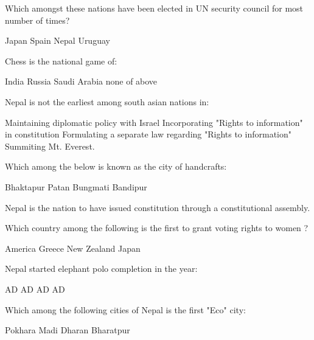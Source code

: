 \begin{questions}
\question Which amongst these nations have been elected in UN security council for most number of times?
  \begin{choices}
  \choice Japan
  \choice Spain
  \choice Nepal
  \CorrectChoice Uruguay
  \end{choices}

\question Chess is the national game of:

  \begin{oneparchoices}
  \choice India
  \CorrectChoice Russia
  \choice Saudi Arabia
  \choice none of above
  \end{oneparchoices}

\question Nepal is not the earliest among south asian nations in:
  \begin{choices}
  \choice Maintaining diplomatic policy with Israel
  \CorrectChoice Incorporating "Rights to information" in constitution
  \choice Formulating a separate law regarding "Rights to information"
  \choice Summiting Mt. Everest.
  \end{choices}

\question Which among the below is known as the city of handcrafts:
  \begin{choices}
  \choice Bhaktapur
  \CorrectChoice Patan
  \choice Bungmati
  \choice Bandipur
  \end{choices}

\question Nepal is the \fillin[][2cm] nation to have issued constitution through a constitutional assembly.
  \begin{choices}
  \end{choices}

\question Which country among the following is the first to grant voting rights to women ?
  \begin{choices}
  \choice America
  \choice Greece
  \CorrectChoice New Zealand
  \choice Japan
  \end{choices}

\question Nepal started elephant polo completion in the year:
  \begin{choices}
   AD
   AD
   AD
   AD
  \end{choices}

\question Which among the following cities of Nepal is the first "Eco" city:
  \begin{choices}
  \choice Pokhara
  \choice Madi
  \choice Dharan
  \CorrectChoice Bharatpur
  \end{choices}


\end{questions}
